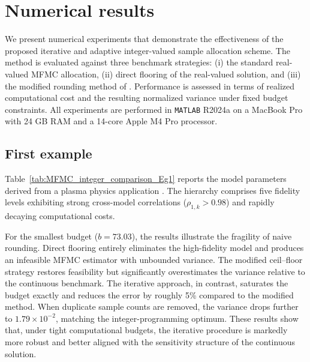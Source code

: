 \section{Numerical results}\label{sec:Num_Result}
We present numerical experiments that demonstrate the effectiveness of the proposed iterative and adaptive integer-valued sample allocation scheme. The method is evaluated against three benchmark strategies: (i) the standard real-valued MFMC allocation, (ii) direct flooring of the real-valued solution, and (iii) the modified rounding method of \cite{GrGuJuWa:2023}. Performance is assessed in terms of realized computational cost and the resulting normalized variance under fixed budget constraints. All experiments are performed in {\tt MATLAB} R2024a on a MacBook Pro with 24 GB RAM and a 14-core Apple M4 Pro processor.




\subsection{First example}
Table~\ref{tab:MFMC_integer_comparison_Eg1} reports the model parameters derived from a plasma physics application \cite{ElLiSa:2023,ElLiSa:2025}. The hierarchy comprises five fidelity levels exhibiting strong cross-model correlations ($\rho_{1,k}>0.98$) and rapidly decaying computational costs.



For the smallest budget ($b=73.03$), the results illustrate the fragility of naive rounding. Direct flooring entirely eliminates the high-fidelity model and produces an infeasible MFMC estimator with unbounded variance. The modified ceil–floor strategy restores feasibility but significantly overestimates the variance relative to the continuous benchmark. The iterative approach, in contrast, saturates the budget exactly and reduces the error by roughly 5\% compared to the modified method. When duplicate sample counts are removed, the variance drops further to $1.79\times 10^{-2}$, matching the integer-programming optimum. These results show that, under tight computational budgets, the iterative procedure is markedly more robust and better aligned with the sensitivity structure of the continuous solution.

